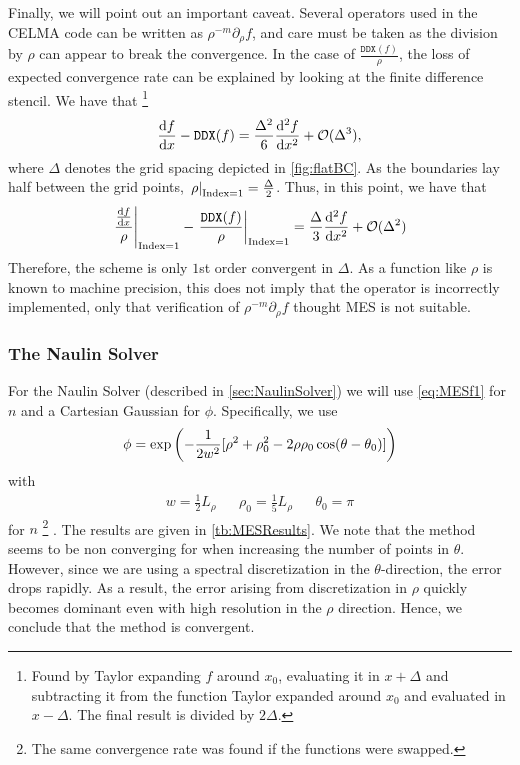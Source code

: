Finally, we will point out an important caveat.
Several operators used in the CELMA code can be written as $\rho^{-m}\partial_\rho f$, and care must be taken as the division by $\rho$ can appear to break the convergence.
In the case of $\frac{\texttt{DDX}(f)}{\rho}$, the loss of expected convergence rate can be explained by looking at the finite difference stencil.
We have that%
%
\footnote{
    Found by Taylor expanding $f$ around $x_0$, evaluating it in $x+\Delta$ and subtracting it from the function Taylor expanded around $x_0$ and evaluated in $x-\Delta$.
    The final result is divided by $2\Delta$.
}
%
\begin{align*}
    \frac{\text{d}{f}}{\text{d}{x}} - \texttt{DDX}(f) =
    \frac{\Delta^2}{6}\frac{\text{d}{^2f}}{\text{d}{x^2}} + \mathcal{O}(\Delta^3),
\end{align*}
%
where $\Delta$ denotes the grid spacing depicted in \cref{fig:flatBC}.
As the boundaries lay half between the grid points, $\left.\rho\right|_{\text{Index}=1}=\frac{\Delta}{2}$.
Thus, in this point, we have that
%
\begin{align*}
    \left.\frac{\frac{\text{d}{f}}{\text{d}{x}}}{\rho}\right|_{\text{Index}=1}
    - \left.\frac{\texttt{DDX}(f)}{\rho}\right|_{\text{Index}=1}
    = \frac{\Delta}{3}\frac{\text{d}{^2f}}{\text{d}{x^2}} + \mathcal{O}(\Delta^2)
\end{align*}
%
Therefore, the scheme is only $1$st order convergent in $\Delta$.
As a function like $\rho$ is known to machine precision, this does not imply that the operator is incorrectly implemented, only that verification of $\rho^{-m}\partial_\rho f$ thought MES is not suitable.

\subsubsection{The Naulin Solver}
%
For the Naulin Solver (described in \cref{sec:NaulinSolver}) we will use \cref{eq:MESf1} for $n$ and a Cartesian Gaussian for $\phi$.
Specifically, we use
%
\begin{align}
\phi = \exp\left(-\frac{1}{2w^2}[\rho^2 + \rho_0^2 - 2\rho\rho_0\cos(\theta - \theta_0)] \right)
\label{eq:MESf2}
\end{align}
%
with
%
\begin{align*}
& w = \frac{1}{2}L_\rho &
& \rho_0 = \frac{1}{5}L_\rho &
& \theta_0 = \pi &
\end{align*}
%
for $n$%
\footnote{The same convergence rate was found if the functions were swapped.}%
.
The results are given in \cref{tb:MESResults}.
We note that the method seems to be non converging for when increasing the number of points in $\theta$.
However, since we are using a spectral discretization in the $\theta$-direction, the error drops rapidly.
As a result, the error arising from discretization in $\rho$ quickly becomes dominant even with high resolution in the $\rho$ direction.
Hence, we conclude that the method is convergent.

